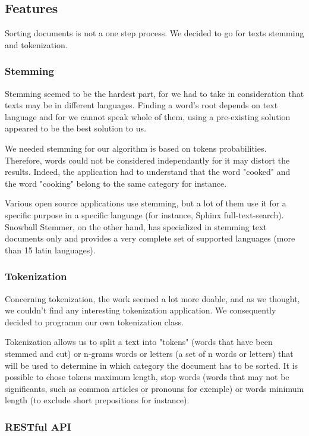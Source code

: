 \documentclass[a4paper,11pt]{article}
\begin{document}
\subsection{Features}

Sorting documents is not a one step process. We decided to go for texts
stemming and tokenization.

\subsubsection{Stemming}

Stemming seemed to be the hardest part, for we had to take in consideration
that texts may be in different languages. Finding a word's root depends on
text language and for we cannot speak whole of them, using a pre-existing
solution appeared to be the best solution to us.

We needed stemming for our algorithm is based on tokens probabilities.
Therefore, words could not be considered independantly for it may distort
the results. Indeed, the application had to understand that the word "cooked"
and the word "cooking" belong to the same category for instance.

Various open source applications use stemming, but a lot of them use it for
a specific purpose in a specific language (for instance, Sphinx
full-text-search). Snowball Stemmer, on the other hand, has specialized in
stemming text documents only and provides a very complete set of supported
languages (more than 15 latin languages).

\subsubsection{Tokenization}

Concerning tokenization, the work seemed a lot more doable, and as we
thought, we couldn't find any interesting tokenization application. We
consequently decided to programm our own tokenization class.

Tokenization allows us to split a text into "tokens" (words that have
been stemmed and cut) or n-grams words or letters (a set of n words or
letters) that will be used to determine in which category the document has to
 be sorted. It is possible to chose tokens maximum length, stop words (words
that may not be significants, such as common articles or pronouns for
exemple) or words minimum length (to exclude short prepositions for
instance).

\subsubsection{RESTful API}
\end{document}
